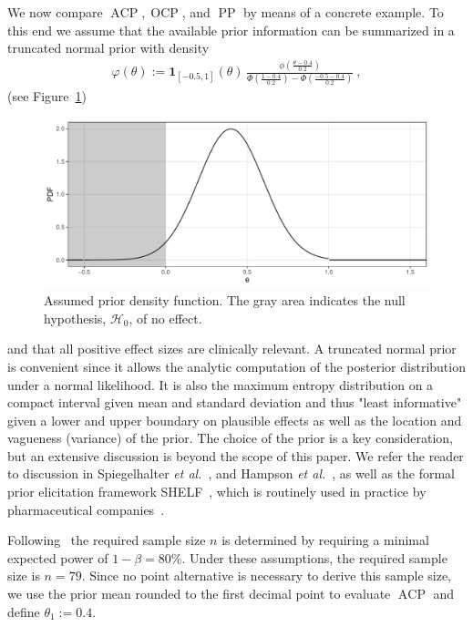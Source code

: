 \documentclass[12pt]{article}
\newcommand{\ACP}{\ensuremath{\operatorname{ACP}}}
\newcommand{\OCP}{\ensuremath{\operatorname{OCP}}}
\newcommand{\PP}{\ensuremath{\operatorname{PP}}}
\begin{document}
We now compare $\ACP, \OCP$, and $\PP$ by means of a concrete example.
To this end we assume that the available prior information can be summarized in a truncated normal prior with density
\begin{align}
    \varphi(\theta) := \boldsymbol{1}_{[-0.5, 1]}(\theta)\,\frac{\displaystyle \phi\left(\frac{\theta - 0.4}{0.2}\right)}{\displaystyle \Phi\left(\frac{1 - 0.4}{0.2}\right) - \Phi\left(\frac{-0.5 - 0.4}{0.2}\right)} \ ,
\end{align}
(see Figure~\ref{fig:prior-pdf})
\begin{figure}
    \centering
    \includegraphics[width=\textwidth]{figures/prior_density}
    \caption{%
        Assumed prior density function.
        The gray area indicates the null hypothesis, $\mathcal{H}_0$, of no effect.
    }
    \label{fig:prior-pdf}
\end{figure}
and that all positive effect sizes are clinically relevant.
A truncated normal prior is convenient since it allows the analytic
computation of the posterior distribution under a normal likelihood.
It is also the maximum entropy distribution on a compact interval given mean and standard deviation and thus "least informative"
given a lower and upper boundary on plausible effects as well as
the location and vagueness (variance) of the prior.
The choice of the prior is a key consideration, but an extensive discussion is beyond the scope of this paper. We refer the reader to discussion in Spiegelhalter \textit{et al.}~\cite{spiegelhalter2004,rufibach_16}, and Hampson \textit{et al.}~\cite{hampson2021}, as well as the formal prior elicitation framework SHELF~\cite{kinnersley2013, shelf}, which is routinely used in practice by pharmaceutical companies~\cite{dallow2018}.

Following~\cite{kunzmann2020} the required
sample size $n$ is determined by requiring
a minimal expected power of $1-\beta=80\%$.
Under these assumptions, the required sample size is
$n = 79$.
Since no point alternative is necessary to derive this sample size, we use the prior mean rounded to the first decimal point to
evaluate $\ACP$ and define $\theta_1:=0.4$.
\end{document}
